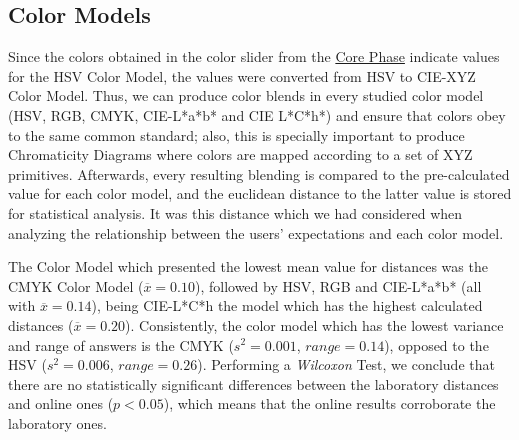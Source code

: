 \subsection{Color Models}
%
Since the colors obtained in the color slider from the \ul{Core Phase} indicate values for the HSV Color
Model, the values were converted from HSV to CIE-XYZ Color Model. Thus, we can produce color blends in
every studied color model (HSV, RGB, CMYK, CIE-L*a*b* and CIE L*C*h*) and ensure that colors obey to the
same common standard; also, this is specially important to produce Chromaticity Diagrams where colors are
mapped according to a set of XYZ primitives. Afterwards, every resulting blending is compared to the
pre-calculated value for each color model, and the euclidean distance to the latter value is stored
for statistical analysis. It was this distance which we had considered when analyzing the relationship
between the users’ expectations and each color model. \par
%
The Color Model which presented the lowest mean value for distances was the CMYK Color Model
($\overline{x} = 0.10$), followed by HSV, RGB and CIE-L*a*b* (all with $\overline{x} = 0.14$), being
CIE-L*C*h the model which has the highest calculated distances ($\overline{x} = 0.20$). Consistently,
the color model which has the lowest variance and range of answers is the CMYK ($s^2 = 0.001$, $range
= 0.14$), opposed to the HSV ($s^2 = 0.006$, $range = 0.26$). Performing a \emph{Wilcoxon} Test, we
conclude that there are no statistically significant differences between the laboratory distances and
online ones ($p < 0.05$), which means that the online results corroborate the laboratory ones.
%
